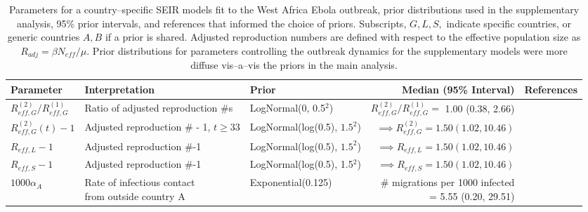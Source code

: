 \begin{table}
	\begin{fullpage}
		\caption[Parameters and priors for supplementary country--specific SEIR models fit to the West Africa Ebola outbreak.]{Parameters for a country--specific SEIR models fit to the West Africa Ebola outbreak, prior distributions used in the supplementary analysis, 95\% prior intervals, and references that informed the choice of priors. Subscripts, $ G,L,S, $ indicate specific countries, or generic countries $ A,B $ if a prior is shared. Adjusted reproduction numbers are defined with respect to the effective population size as $ R_{adj} = \beta N_{eff} /\mu $. Prior distributions for parameters controlling the outbreak dynamics for the supplementary models were more diffuse vis--a--vis the priors in the main analysis.}
		\label{tab:ebola_priors_single_diff}
		\scriptsize
		\centering
		\begin{tabular}{lllrr}
			\hline
			\textbf{Parameter} &  \textbf{Interpretation} & \textbf{Prior} & \textbf{Median (95\% Interval)} & \textbf{References} \\ \hline
			$ R_{eff,G}^{(2)} / R_{eff,G}^{(1)} $ & Ratio of adjusted reproduction \#s &  LogNormal(0, 0.5$ ^2 $) & $ R_{eff,G}^{(2)} / R_{eff,G}^{(1)} = $ 1.00 (0.38, 2.66) & \cite{chowell2014transmission,chretien2015mathematical,coltart2017ebola,king2015avoidable} \\
			$ R_{eff,G}^{(2)}(t)-1 $ & Adjusted reproduction \# - 1, $ t\geq33 $ & LogNormal(log(0.5), $ 1.5^2 $) & $ \implies R_{eff,G}^{(2)} = 1.50 (1.02, 10.46)$ &  \cite{chowell2014transmission,chretien2015mathematical,coltart2017ebola,king2015avoidable} \\
			$ R_{eff,L} -1 $ & Adjusted reproduction \#-1 &  LogNormal(log(0.5), $ 1.5^2 $) & $ \implies R_{eff,L} = 1.50 (1.02, 10.46)$ &  \cite{chowell2014transmission,chretien2015mathematical,coltart2017ebola,king2015avoidable} \\
			$ R_{eff,S}-1 $ & Adjusted reproduction \#-1 & LogNormal(log(0.5), 1.5$ ^2 $) & $ \implies R_{eff,S} = 1.50 (1.02, 10.46)$ &  \cite{chowell2014transmission,chretien2015mathematical,coltart2017ebola,king2015avoidable}\\
			$ 1000\alpha_{A}$ & \makecell[l]{Rate of infectious contact \\ from outside  country A} & Exponential(0.125) & \makecell[r]{\# migrations per 1000 infected \\ = 5.55 (0.20, 29.51)} & \cite{dudas2017virus}\\ 

\end{tabular}
\end{fullpage}
\end{table}
